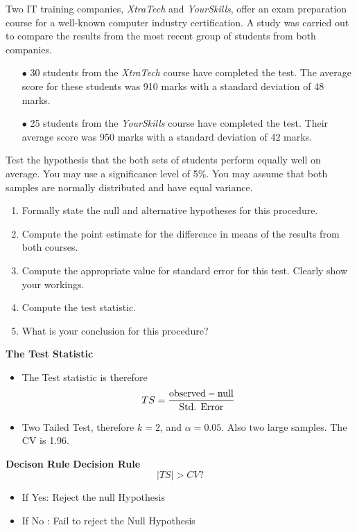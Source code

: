 \documentclass[a4paper,12pt]{article}
\begin{document}
\large


Two IT training companies, \textit{XtraTech} and \textit{YourSkills}, offer an exam preparation course for a well-known computer industry certification. A study was carried out to compare the results from the most recent group of students from both companies.
\begin{itemize}
\item[$\bullet$]30 students from the \textit{XtraTech} course have completed the test. The average score for these students was 910 marks with a standard deviation of 48 marks.

\item[$\bullet$]25 students from the \textit{YourSkills} course have completed the test. Their average score was 950 marks with a standard deviation of 42 marks.
\end{itemize}

Test the hypothesis that the both sets of students perform equally well on average. You may use a significance level of 5\%. You may assume that both samples are normally distributed and have equal variance.
\begin{enumerate}
\item  Formally state the null and alternative hypotheses for this procedure.
\item  Compute the point estimate for the difference in means of the results from both courses.
\item  Compute the appropriate value for standard error for this test. Clearly show your workings.
\item  Compute the test statistic.
\item  What is your conclusion for this procedure?
\end{enumerate}


\noindent \textbf{The Test Statistic}
\begin{itemize}
\item The Test statistic is therefore
\[ TS = {\mbox{observed} - \mbox{null} \over \mbox{Std. Error}}  \]
\item Two Tailed Test, therefore $k = 2$, and $\alpha = 0.05$. Also two large samples. The CV is 1.96.
\end{itemize}


\noindent \textbf{Decison Rule}
\textbf{Decision Rule}
\[ |TS| > CV ?  \]
\begin{itemize}
\item If Yes: Reject the null Hypothesis
\item If No : Fail to reject the Null Hypothesis
\end{itemize}
\end{document}
